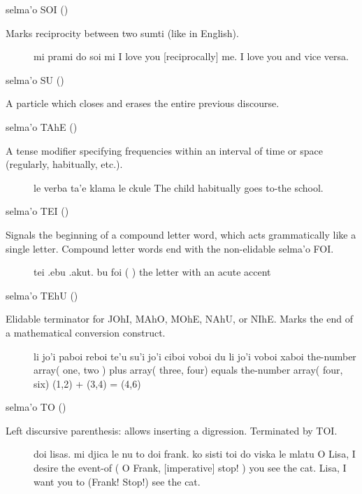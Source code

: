 selma'o SOI () 

Marks reciprocity between two sumti (like  in
    English).
\begin{description}
\item[] mi prami do soi mi I love you [reciprocally] me. I love you and vice versa.
\end{description}

selma'o SU () 

A particle which closes and erases the entire previous
    discourse.

selma'o TAhE ()

A tense modifier specifying frequencies within an interval
    of time or space (regularly, habitually, etc.).
\begin{description}
\item[] le verba ta'e klama le ckule The child habitually goes to-the school.
\end{description}

selma'o TEI () 

Signals the beginning of a compound letter word, which acts
    grammatically like a single letter. Compound letter words end
    with the non-elidable selma'o FOI.
\begin{description}
\item[] tei .ebu .akut. bu foi (   ) the letter  with an acute accent
\end{description}

selma'o TEhU () 

Elidable terminator for JOhI, MAhO, MOhE, NAhU, or NIhE.
    Marks the end of a mathematical conversion construct.
\begin{description}
\item[] li jo'i paboi reboi te'u su'i jo'i ciboi voboi du li jo'i voboi xaboi the-number array( one, two ) plus array( three, four) equals the-number array( four, six) (1,2) + (3,4) = (4,6)
\end{description}

selma'o TO () 

Left discursive parenthesis: allows inserting a digression.
    Terminated by TOI.
\begin{description}
\item[] doi lisas. mi djica le nu to doi frank. ko sisti toi do viska le mlatu O Lisa, I desire the event-of ( O Frank, [imperative] stop! ) you see the cat. Lisa, I want you to (Frank! Stop!) see the cat.
\end{description}

